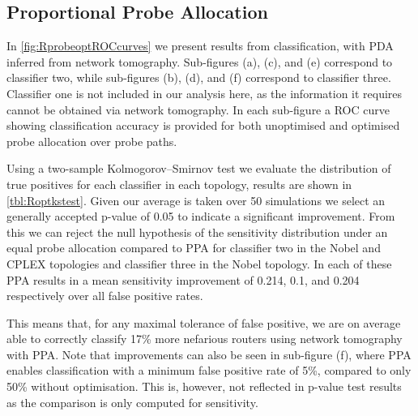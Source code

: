 \subsection{Proportional Probe Allocation}
\label{ssec:Rprobeallocation}
In \cref{fig:RprobeoptROCcurves} we present results from classification, with PDA inferred from network tomography. Sub-figures (a), (c), and (e) correspond to classifier two, while sub-figures (b), (d), and (f) correspond to classifier three. Classifier one is not included in our analysis here, as the information it requires cannot be obtained via network tomography. In each sub-figure a ROC curve showing classification accuracy is provided for both unoptimised and optimised probe allocation over probe paths.\par
Using a two-sample Kolmogorov–Smirnov test we evaluate the distribution of true positives for each classifier in each topology, results are shown in \cref{tbl:Roptkstest}. Given our average is taken over 50 simulations we select an generally accepted p-value of 0.05 to indicate a significant improvement. From this we can reject the null hypothesis of the sensitivity distribution under an equal probe allocation compared to PPA for classifier two in the Nobel and CPLEX topologies and classifier three in the Nobel topology. In each of these PPA results in a mean sensitivity improvement of 0.214, 0.1, and 0.204 respectively over all false positive rates.\par
This means that, for any maximal tolerance of false positive, we are on average able to correctly classify 17\% more nefarious routers using network tomography with PPA. Note that improvements can also be seen in sub-figure (f), where PPA enables classification with a minimum false positive rate of 5\%, compared to only 50\% without optimisation. This is, however, not reflected in p-value test results as the comparison is only computed for sensitivity.\par
\noindent
